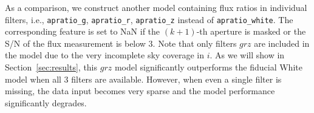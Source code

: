 \documentclass[twocolumn]{aastex631}
\begin{document}
\begin{CJK*}{UTF8}{gbsn}
As a comparison, we construct another model containing flux ratios in individual filters, i.e., \texttt{apratio\_g}, \texttt{apratio\_r}, \texttt{apratio\_z} instead of \texttt{apratio\_white}.
The corresponding feature is set to NaN if the $(k+1)$-th aperture is masked or the S/N of the flux measurement is below 3.
Note that only filters $grz$ are included in the model due to the very incomplete sky coverage in $i$. As we will show in Section~\ref{sec:results}, this $grz$ model significantly outperforms the fiducial White model when all 3 filters are available. However, when even a single filter is missing, the data input becomes very sparse and the model performance significantly degrades.


\end{CJK*}
\end{document}
